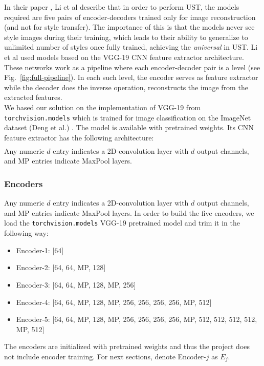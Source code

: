 \hspace{0.5cm} In their paper \cite{bib11}, Li et al describe that in order to perform UST, the models required are five pairs of encoder-decoders trained only for image reconstruction (and not for style transfer). The importance of this is that the models never see style images during their training, which leads to their ability to generalize to unlimited number of styles once fully trained, achieving the \textit{universal} in UST. Li et al used models based on the VGG-19 CNN feature extractor architecture. These networks work as a pipeline where each encoder-decoder pair is a level (see Fig.~\ref{fig:full-pipeline}). In each such level, the encoder serves as feature extractor while the decoder does the inverse operation, reconstructs the image from the extracted features.\\
We based our solution on the implementation of VGG-19 \cite{bib20} from \texttt{torchvision.models} which is trained for image classification on the ImageNet dataset (Deng et al.) \cite{bib21}. The model is available with pretrained weights. Its CNN feature extractor has the following architecture:
\begin{gather*}
[64, 64, MP, 128, 128, MP, 256, 256, 256, 256, MP, 512, 512, 512, 512, MP, 512, 512, 512, 512, MP]
\end{gather*}
Any numeric $d$ entry indicates a 2D-convolution layer with $d$ output channels, and MP entries indicate MaxPool layers.

\subsubsection{Encoders}\label{subsec:Encoders}
Any numeric $d$ entry indicates a 2D-convolution layer with $d$ output channels, and MP entries indicate MaxPool layers. In order to build the five encoders, we load the \texttt{torchvision.models} VGG-19 pretrained model and trim it in the following way:
\begin{itemize}
	\item Encoder-1: [64]
	\item Encoder-2: [64, 64, MP, 128]
	\item Encoder-3: [64, 64, MP, 128, MP, 256]
	\item Encoder-4: [64, 64, MP, 128, MP, 256, 256, 256, 256, MP, 512]
	\item Encoder-5: [64, 64, MP, 128, MP, 256, 256, 256, 256, MP, 512, 512, 512, 512, MP, 512]
\end{itemize}
The encoders are initialized with pretrained weights and thus the project does not include encoder training. For next sections, denote Encoder-$j$ as $E_j$.


